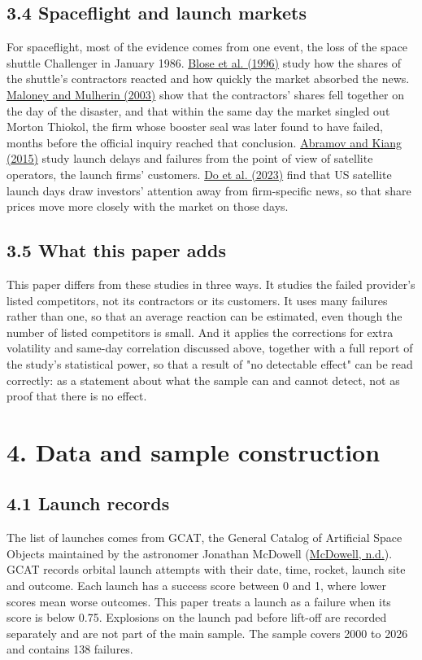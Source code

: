 \documentclass[12pt,a4paper]{article}
\begin{document}
\subsection*{3.4 Spaceflight and launch markets}
For spaceflight, most of the evidence comes from one event, the loss of the space shuttle Challenger in January 1986. \hyperlink{ref-blose1996}{Blose et al. (1996)} study how the shares of the shuttle's contractors reacted and how quickly the market absorbed the news. \hyperlink{ref-maloney2003}{Maloney and Mulherin (2003)} show that the contractors' shares fell together on the day of the disaster, and that within the same day the market singled out Morton Thiokol, the firm whose booster seal was later found to have failed, months before the official inquiry reached that conclusion. \hyperlink{ref-abramov2015}{Abramov and Kiang (2015)} study launch delays and failures from the point of view of satellite operators, the launch firms' customers. \hyperlink{ref-do2023}{Do et al. (2023)} find that US satellite launch days draw investors' attention away from firm-specific news, so that share prices move more closely with the market on those days.

\subsection*{3.5 What this paper adds}
This paper differs from these studies in three ways. It studies the failed provider's listed competitors, not its contractors or its customers. It uses many failures rather than one, so that an average reaction can be estimated, even though the number of listed competitors is small. And it applies the corrections for extra volatility and same-day correlation discussed above, together with a full report of the study's statistical power, so that a result of "no detectable effect" can be read correctly: as a statement about what the sample can and cannot detect, not as proof that there is no effect.

\section*{\hypertarget{s4}{}4. Data and sample construction}
\subsection*{4.1 Launch records}
The list of launches comes from GCAT, the General Catalog of Artificial Space Objects maintained by the astronomer Jonathan McDowell (\hyperlink{ref-mcdowell}{McDowell, n.d.}). GCAT records orbital launch attempts with their date, time, rocket, launch site and outcome. Each launch has a success score between 0 and 1, where lower scores mean worse outcomes. This paper treats a launch as a failure when its score is below 0.75. Explosions on the launch pad before lift-off are recorded separately and are not part of the main sample. The sample covers 2000 to 2026 and contains 138 failures.
\end{document}

